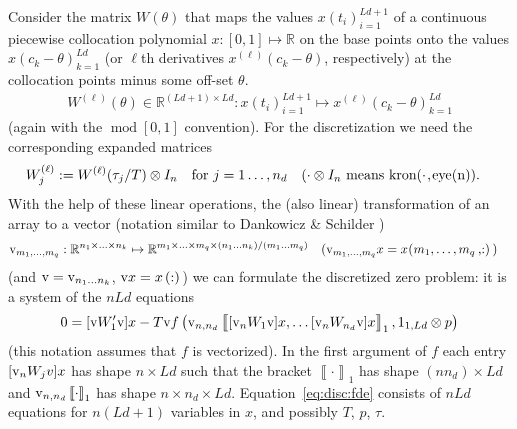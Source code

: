 \documentclass[11pt]{scrartcl}
\newcommand{\blist}[1]{\mbox{\lstinline!#1!}}
\newcommand{\R}{\mathbb{R}}
\renewcommand{\vec}{\blist{v}}
\renewcommand{\mod}{\operatorname{mod}}
\newcommand{\llb}{\left\llbracket}
\newcommand{\rrb}{\right\rrbracket}
\newcommand{\id}{I}
\begin{document}
Consider the matrix $W(\theta)$ that maps the values
$x(t_i)_{i=1}^{Ld+1}$ of a continuous piecewise collocation polynomial
$x:[0,1]\mapsto \R$ on the base points onto the values
$x(c_k-\theta)_{k=1}^{Ld}$ (or $\ell$th derivatives
$x^{(\ell)}(c_k-\theta)$, respectively) at the collocation points
minus some off-set $\theta$.
\begin{align*}
  W^{(\ell)}(\theta)\in\R^{(Ld+1)\times Ld}: x(t_i)_{i=1}^{Ld+1}\mapsto 
  x^{(\ell)}(c_k-\theta)_{k=1}^{Ld}
\end{align*}
(again with the $\mod[0,1]$ convention). For the discretization we
need the corresponding expanded matrices
\begin{align*}
  W^{(\ell)}_j&:=W^{(\ell)}(\tau_j/T)\otimes\id_n \mbox{\quad for
    $j=1\ldots,n_d$} && \mbox{($\cdot\otimes \id_n$ means
    \blist{kron(}$\cdot$\blist{,eye(n)}).}
\end{align*}
With the help of these linear operations, the (also linear)
transformation of an array to a vector (notation similar to Dankowicz
\& Schilder \cite{HS13})
\begin{align*}
  \vec_{m_1,\ldots,m_q}&:\R^{n_1\times \ldots \times n_k}\mapsto 
  \R^{m_1\times\ldots\times m_q\times (n_1\ldots n_k)/(m_1\ldots m_q)}&&
  \mbox{($\vec_{m_1,\ldots,m_q} x=x\blist{(}m_1,\ldots,m_q\blist{,:)}$)}
\end{align*}
(and $\vec=\vec_{n_1\ldots n_k}$, $\vec x=x\blist{(:)}$) we can
formulate the discretized zero problem: it is a system of the $nLd$
equations
\begin{equation}
  \label{eq:disc:fde}
  0=[\vec W'_1\vec]x-T\vec f\left(\vec_{n,n_d}\llb\phantom{\big|}\!\![\vec_nW_1\vec] x,\ldots [\vec_nW_{n_d}\vec]x\rrb_1,1_{1,Ld}\otimes p\right)
\end{equation}
(this notation assumes that $f$ is vectorized). In the first argument
of $f$ each entry $[\vec_nW_jv]x$ has shape $n\times Ld$ such that the
bracket $\llb\cdot\rrb_1$ has shape $ (n n_d)\times Ld$ and
$\vec_{n,n_d}\llb\cdot\rrb_1$ has shape $n\times n_d\times
Ld$. Equation~\eqref{eq:disc:fde} consists of $nLd$ equations for
$n(Ld+1)$ variables in $x$, and possibly $T$, $p$, $\tau$.
\end{document}
